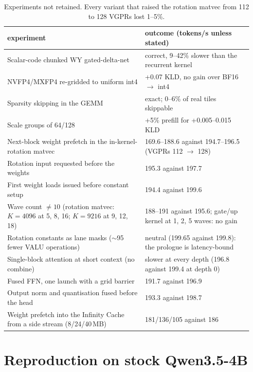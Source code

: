 \documentclass[10.5pt,a4paper]{article}
\begin{document}
\begin{table}[H]
\centering\small
\begin{tabularx}{\linewidth}{@{}>{\raggedright\arraybackslash}p{6.0cm}X@{}}
\toprule
experiment & outcome (tokens/s unless stated)\\
\midrule
Scalar-code chunked WY gated-delta-net & correct, 9--42\% slower than the recurrent kernel\\
NVFP4/MXFP4 re-gridded to uniform int4 & +0.07 KLD, no gain over BF16 $\to$ int4\\
Sparsity skipping in the GEMM & exact; 0--6\% of real tiles skippable\\
Scale groups of 64/128 & +5\% prefill for +0.005--0.015 KLD\\
Next-block weight prefetch in the in-kernel-rotation matvec & 169.6--188.6 against 194.7--196.5 (VGPRs 112 $\to$ 128)\\
Rotation input requested before the weights & 195.3 against 197.7\\
First weight loads issued before constant setup & 194.4 against 199.6\\
Wave count $\ne10$ (rotation matvec: $K{=}4096$ at 5, 8, 16; $K{=}9216$ at 9, 12, 18) & 188--191 against 195.6; gate/up kernel at 1, 2, 5 waves: no gain\\
Rotation constants as lane masks ($\sim$95 fewer VALU operations) & neutral (199.65 against 199.8): the prologue is latency-bound\\
Single-block attention at short context (no combine) & slower at every depth (196.8 against 199.4 at depth 0)\\
Fused FFN, one launch with a grid barrier & 191.7 against 196.9\\
Output norm and quantisation fused before the head & 193.3 against 198.7\\
Weight prefetch into the Infinity Cache from a side stream (8/24/40\,MB) & 181/136/105 against 186\\
\bottomrule
\end{tabularx}
\caption{Experiments not retained. Every variant that raised the rotation matvec from 112 to 128 VGPRs lost 1--5\%.}
\end{table}

\section{Reproduction on stock Qwen3.5-4B}
\label{sec:repro}
\end{document}

